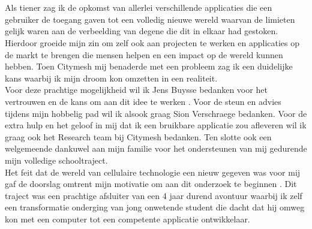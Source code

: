
\chapter*{}%
\label{ch:voorwoord}


Als tiener zag ik de opkomst van allerlei verschillende applicaties die een gebruiker de toegang gaven tot een volledig nieuwe wereld waarvan de limieten gelijk waren aan de verbeelding van degene die dit in elkaar had gestoken. Hierdoor groeide mijn zin om zelf ook aan projecten te werken en applicaties op de markt te brengen die mensen helpen en een impact op de wereld kunnen hebben. Toen Citymesh mij benaderde met een probleem zag ik een duidelijke kans waarbij ik mijn droom kon omzetten in een realiteit. \\

Voor deze prachtige mogelijkheid wil ik Jens Buysse bedanken voor het vertrouwen en de kans om aan dit idee te werken . Voor de steun en advies tijdens mijn hobbelig pad wil ik alsook graag Sion Verschraege bedanken. Voor de extra hulp en het geloof in mij dat ik een bruikbare applicatie zou afleveren wil ik graag ook het Research team bij Citymesh bedanken. Ten slotte ook een welgemeende dankuwel aan mijn familie voor het ondersteunen van mij gedurende mijn volledige schooltraject. \\

Het feit dat de wereld van cellulaire technologie een nieuw gegeven was voor mij gaf de doorslag omtrent mijn motivatie om aan dit onderzoek te beginnen . Dit traject was een prachtige afsluiter van een 4 jaar durend avontuur waarbij ik zelf een transformatie onderging van jong onwetende student die dacht dat hij omweg kon met een computer tot een competente applicatie ontwikkelaar.